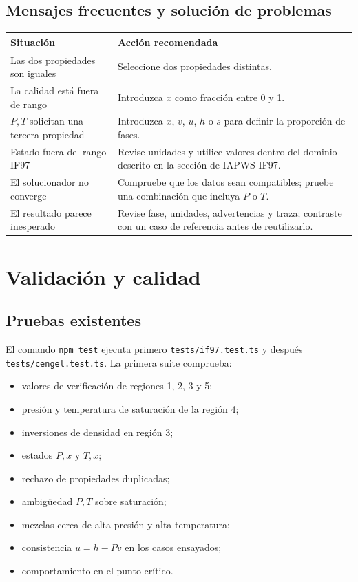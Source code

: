 \documentclass[11pt,a4paper,oneside]{article}
\newcommand{\code}[1]{\texttt{#1}}
\begin{document}
\subsection{Mensajes frecuentes y soluci\'on de problemas}

\begin{longtable}{p{5.1cm}p{9.1cm}}
\toprule
Situaci\'on & Acci\'on recomendada \\
\midrule
\endhead
Las dos propiedades son iguales & Seleccione dos propiedades distintas. \\
La calidad est\'a fuera de rango & Introduzca $x$ como fracci\'on entre 0 y 1. \\
$P,T$ solicitan una tercera propiedad & Introduzca $x$, $v$, $u$, $h$ o $s$ para definir la proporci\'on de fases. \\
Estado fuera del rango IF97 & Revise unidades y utilice valores dentro del dominio descrito en la secci\'on de IAPWS-IF97. \\
El solucionador no converge & Compruebe que los datos sean compatibles; pruebe una combinaci\'on que incluya $P$ o $T$. \\
El resultado parece inesperado & Revise fase, unidades, advertencias y traza; contraste con un caso de referencia antes de reutilizarlo. \\
\bottomrule
\end{longtable}

\section{Validaci\'on y calidad}

\subsection{Pruebas existentes}

El comando \code{npm test} ejecuta primero \code{tests/if97.test.ts} y despu\'es \code{tests/cengel.test.ts}. La primera suite comprueba:

\begin{itemize}
  \item valores de verificaci\'on de regiones 1, 2, 3 y 5;
  \item presi\'on y temperatura de saturaci\'on de la regi\'on 4;
  \item inversiones de densidad en regi\'on 3;
  \item estados $P,x$ y $T,x$;
  \item rechazo de propiedades duplicadas;
  \item ambig\"uedad $P,T$ sobre saturaci\'on;
  \item mezclas cerca de alta presi\'on y alta temperatura;
  \item consistencia $u=h-Pv$ en los casos ensayados;
  \item comportamiento en el punto cr\'itico.
\end{itemize}
\end{document}
